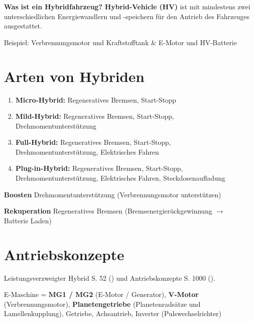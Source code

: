 \textbf{Was ist ein Hybridfahrzeug? Hybrid-Vehicle (HV)} ist mit
mindestens zwei unterschiedlichen Energiewandlern und -speichern für den
Antrieb des Fahrzeuges ausgestattet.

Beispiel: Verbrennungsmotor und Kraftstofftank \& E-Motor und
HV-Batterie

\section{Arten von Hybriden}\label{arten-von-hybriden}

\begin{enumerate}
\item
  \textbf{Micro-Hybrid:} Regeneratives Bremsen, Start-Stopp
\item
  \textbf{Mild-Hybrid:} Regeneratives Bremsen, Start-Stopp,
  Drehmomentunterstützung
\item
  \textbf{Full-Hybrid:} Regeneratives Bremsen, Start-Stopp,
  Drehmomentunterstützung, Elektrisches Fahren
\item
  \textbf{Plug-in-Hybrid:} Regeneratives Bremsen, Start-Stopp,
  Drehmomentunterstützung, Elektrisches Fahren, Steckdosenaufladung
\end{enumerate}

\textbf{Boosten} Drehmomentunterstützung (Verbrennungsmotor
unterstützen)

\textbf{Rekuperation} Regeneratives Bremsen (Bremsenergierückgewinnung
$\to$ Batterie Laden)

\section{Antriebskonzepte}\label{antriebskonzepte}

Leistungsverzweigter Hybrid S. 52 (\textcite{schmidt:2021:hybrid}) und
Antriebskonzepte S. 1000 (\textcite{reif:2022:boschkraftfahrtechnisches}).

E-Maschine = \textbf{MG1 / MG2} (E-Motor / Generator), \textbf{V-Motor}
(Verbrennungsmotor), \textbf{Planetengetriebe} (Planetenradsätze und
Lamellenkupplung), Getriebe, Achsantrieb, Inverter (Pulswechselrichter)

